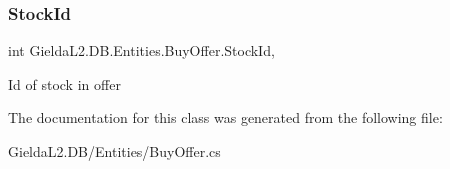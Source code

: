 \subsubsection{\texorpdfstring{StockId}{StockId}}
{\footnotesize\ttfamily int Gielda\+L2.\+D\+B.\+Entities.\+Buy\+Offer.\+Stock\+Id\hspace{0.3cm}{\ttfamily [get]}, {\ttfamily [set]}}



Id of stock in offer 



The documentation for this class was generated from the following file\+:\begin{DoxyCompactItemize}
\item 
Gielda\+L2.\+D\+B/\+Entities/Buy\+Offer.\+cs\end{DoxyCompactItemize}
